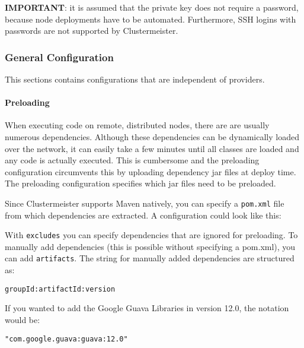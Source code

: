 \documentclass{article}
\begin{document}


\textbf{IMPORTANT}: it is assumed that the private key does not require a password, because node deployments have to be automated. Furthermore, SSH logins with passwords are not supported by Clustermeister.

\subsubsection{General Configuration}

This sections contains configurations that are independent of providers.

\paragraph{Preloading}

When executing code on remote, distributed nodes, there are are usually numerous dependencies. Although these dependencies can be dynamically loaded over the network, it can easily take a few minutes until all classes are loaded and any code is actually executed. This is cumbersome and the preloading configuration circumvents this by uploading dependency jar files at deploy time. The preloading configuration specifies which jar files need to be preloaded.

Since Clustermeister supports Maven natively, you can specify a \texttt{pom.xml} file from which dependencies are extracted. A configuration could look like this:



With \texttt{excludes} you can specify dependencies that are ignored for preloading. To manually add dependencies (this is possible without specifying a pom.xml), you can add \texttt{artifacts}. The string for manually added dependencies are structured as: 

\begin{lstlisting}[breaklines=true]
groupId:artifactId:version
\end{lstlisting}

If you wanted to add the Google Guava Libraries in version 12.0, the notation would be:

\begin{lstlisting}[breaklines=true]
"com.google.guava:guava:12.0"
\end{lstlisting}
\end{document}
